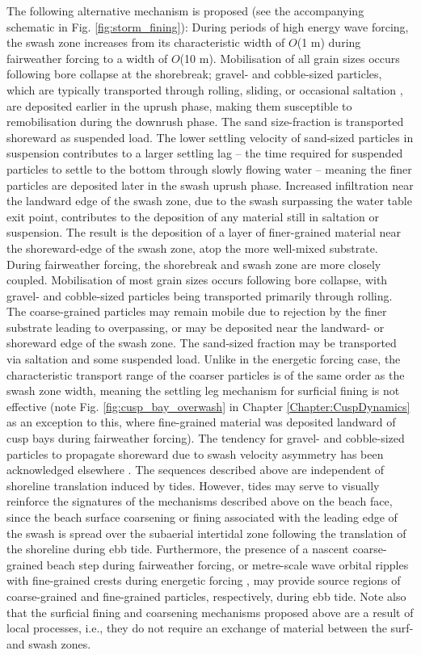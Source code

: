 The following alternative mechanism is proposed (see the accompanying schematic in Fig. \ref{fig:storm_fining}): During periods of high energy wave forcing, the swash zone increases from its characteristic width of $O$(1 m) during fairweather forcing to a width of $O$(10 m). Mobilisation of all grain sizes occurs following bore collapse at the shorebreak; gravel- and cobble-sized particles, which are typically transported through rolling, sliding, or occasional saltation \citep{Carter_Orford1984}, are deposited earlier in the uprush phase, making them susceptible to remobilisation during the downrush phase. The sand size-fraction is transported shoreward as suspended load. The lower settling velocity of sand-sized particles in suspension contributes to a larger settling lag -- the time required for suspended particles to settle to the bottom through slowly flowing water \citep{Masselink_Puleo2006} -- meaning the finer particles are deposited later in the swash uprush phase. Increased infiltration near the landward edge of the swash zone, due to the swash surpassing the water table exit point, contributes to the deposition of any material still in saltation or suspension. The result is the deposition of a layer of finer-grained material near the shoreward-edge of the swash zone, atop the more well-mixed substrate. During fairweather forcing, the shorebreak and swash zone are more closely coupled. Mobilisation of most grain sizes occurs following bore collapse, with gravel- and cobble-sized particles being transported primarily through rolling. The coarse-grained particles may remain mobile due to rejection by the finer substrate leading to overpassing, or may be deposited near the landward- or shoreward edge of the swash zone. The sand-sized fraction may be transported via saltation and some suspended load. Unlike in the energetic forcing case, the characteristic transport range of the coarser particles is of the same order as the swash zone width, meaning the settling leg mechanism for surficial fining is not effective (note Fig. \ref{fig:cusp_bay_overwash} in Chapter \ref{Chapter:CuspDynamics} as an exception to this, where fine-grained material was deposited landward of cusp bays during fairweather forcing). The tendency for gravel- and cobble-sized particles to propagate shoreward due to swash velocity asymmetry has been acknowledged elsewhere \citep{Carr1983}. The sequences described above are independent of shoreline translation induced by tides. However, tides may serve to visually reinforce the signatures of the mechanisms described above on the beach face, since the beach surface coarsening or fining associated with the leading edge of the swash is spread over the subaerial intertidal zone following the translation of the shoreline during ebb tide. Furthermore, the presence of a nascent coarse-grained beach step during fairweather forcing, or metre-scale wave orbital ripples with fine-grained crests during energetic forcing \citep[see][]{Hay_etal2014}, may provide source regions of coarse-grained and fine-grained particles, respectively, during ebb tide. Note also that the surficial fining and coarsening mechanisms proposed above are a result of local processes, i.e., they do not require an exchange of material between the surf- and swash zones.

